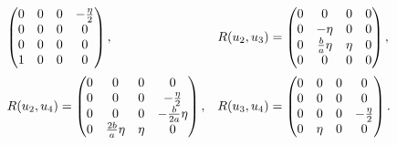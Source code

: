 \documentclass{amsart}
\theoremstyle{plain}
\theoremstyle{remark}
\begin{document}
{{\begin{equation}
\begin{array}{ll}
\begin{pmatrix}
0 & 0 & 0 & -\frac{\eta}{2}\\
0 & 0 & 0 & 0\\
0 & 0 & 0 & 0\\
1 & 0 & 0 & 0
\end{pmatrix}, &
R(u_2,u_3) = \begin{pmatrix}
0 & 0 & 0 & 0\\
0 & -\eta & 0 & 0\\
0 & \frac{b}{a}\eta & \eta & 0\\
0 & 0 & 0 & 0
\end{pmatrix}, \vspace{2mm} \\ 
R(u_2,u_4) = \begin{pmatrix}
0 & 0 & 0 & 0\\
0 & 0 & 0 & -\frac{\eta}{2}\\
0 & 0 & 0 & -\frac{b}{2a}\eta \\
0 & \frac{2b}{a}\eta & \eta & 0
\end{pmatrix}, &
R(u_3,u_4) = \begin{pmatrix}
0 & 0 & 0 & 0\\
0 & 0 & 0 & 0\\
0 & 0 & 0 & -\frac{\eta}{2}\\
0 & \eta & 0 & 0
\end{pmatrix}.
\end{array}
\end{equation}
}

}
\end{document}
